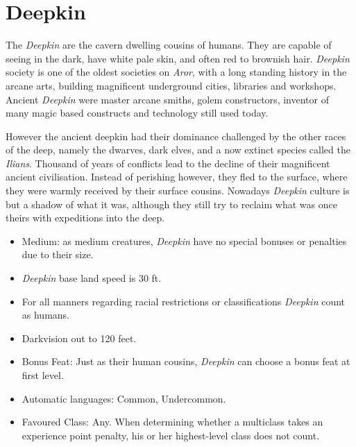 \section*{Deepkin}



The \emph{Deepkin} are the cavern dwelling cousins of humans. They are capable
of seeing in the dark, have white pale skin, and often red to brownish hair.
\emph{Deepkin} society is one of the oldest societies on \emph{Aror}, with a
long standing history in the arcane arts, building magnificent underground
cities, libraries and workshops. Ancient \emph{Deepkin} were master arcane
smiths, golem constructors, inventor of many magic based constructs and
technology still used today.

However the ancient deepkin had their dominance challenged by the other races
of the deep, namely the dwarves, dark elves, and a now extinct species called
the \emph{Ilians}. Thousand of years of conflicts lead to the decline of their
magnificent ancient civilisation. Instead of perishing however, they fled to
the surface, where they were warmly received by their surface cousins. Nowadays
\emph{Deepkin} culture is but a shadow of what it was, although they still try
to reclaim what was once theirs with expeditions into the deep.

\begin{35e}
  \begin{itemize}[noitemsep]
    \item Medium: as medium creatures, \emph{Deepkin} have no special bonuses or
    penalties due to their size.
    \item \emph{Deepkin} base land speed is 30 ft.
    \item For all manners regarding racial restrictions or classifications
    \emph{Deepkin} count as humans.
    \item Darkvision out to 120 feet.
    \item Bonus Feat: Just as their human cousins, \emph{Deepkin} can choose a
    bonus feat at first level.
    \item Automatic languages: Common, Undercommon.
    \item Favoured Class: Any. When determining whether a multiclass takes an
    experience point penalty, his or her highest-level class does not count.
  \end{itemize}
\end{35e}

